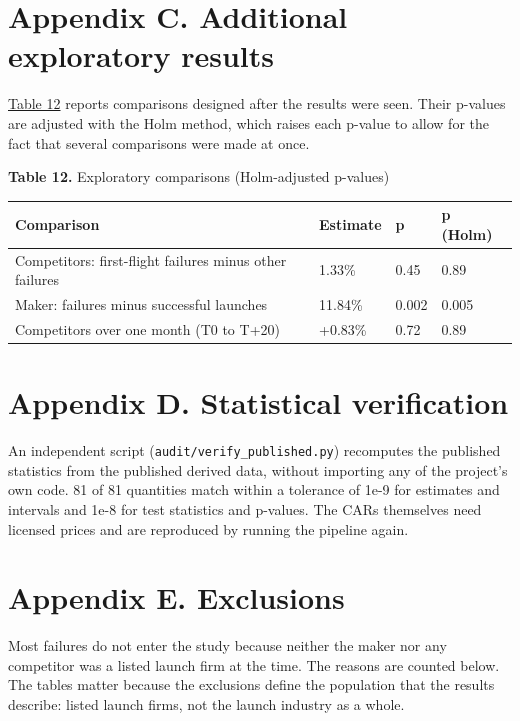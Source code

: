 \documentclass[12pt,a4paper]{article}
\begin{document}
\section*{\hypertarget{apx-c}{}Appendix C. Additional exploratory results}
\hyperlink{tab-expl}{Table 12} reports comparisons designed after the results were seen. Their p-values are adjusted with the Holm method, which raises each p-value to allow for the fact that several comparisons were made at once.

\par\noindent\begin{minipage}{\textwidth}\hypertarget{tab-expl}{}
\textbf{Table 12.} Exploratory comparisons (Holm-adjusted p-values)

{\small\setlength{\tabcolsep}{4pt}\begin{tabularx}{\textwidth}{Xlll}
\toprule
\textbf{Comparison} & \textbf{Estimate} & \textbf{p} & \textbf{p (Holm)} \\
\midrule
Competitors: first-flight failures minus other failures & \textminus{}1.33\% & 0.45 & 0.89 \\
Maker: failures minus successful launches & \textminus{}11.84\% & 0.002 & 0.005 \\
Competitors over one month (T0 to T+20) & +0.83\% & 0.72 & 0.89 \\
\bottomrule
\end{tabularx}}
\vspace{6pt}

\end{minipage}\par\vspace{4pt}

\section*{\hypertarget{apx-d}{}Appendix D. Statistical verification}
An independent script (\texttt{audit/\allowbreak{}verify\_\allowbreak{}published.py}) recomputes the published statistics from the published derived data, without importing any of the project's own code. 81 of 81 quantities match within a tolerance of 1e-9 for estimates and intervals and 1e-8 for test statistics and p-values. The CARs themselves need licensed prices and are reproduced by running the pipeline again.

\section*{\hypertarget{apx-e}{}Appendix E. Exclusions}
Most failures do not enter the study because neither the maker nor any competitor was a listed launch firm at the time. The reasons are counted below. The tables matter because the exclusions define the population that the results describe: listed launch firms, not the launch industry as a whole.
\end{document}
